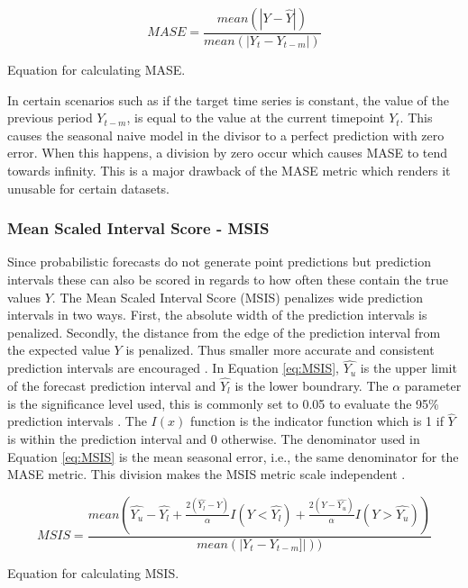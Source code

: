 \begin{eqfloat}
  \begin{equation}
    MASE = \frac{mean(|Y - \hat{Y}|)}{mean(|Y_t - Y_{t-m}|)}
    \label{eq:MASE}
  \end{equation}
  \caption{Equation for calculating MASE.}
\end{eqfloat}

In certain scenarios such as if the target time series is constant, the value of the previous period \(Y_{t-m}\), is equal to the value at the current timepoint \(Y_t\). This causes the seasonal naive model in the divisor to a perfect prediction with zero error. When this happens, a division by zero occur which causes MASE to tend towards infinity. This is a major drawback of the MASE metric which renders it unusable for certain datasets.

\subsubsection{Mean Scaled Interval Score - MSIS}
\label{sec:msis}
Since probabilistic forecasts do not generate point predictions but prediction intervals these can also be scored in regards to how often these contain the true values \(Y\). The Mean Scaled Interval Score (MSIS) penalizes wide prediction intervals in two ways. First, the absolute width of the prediction intervals is penalized. Secondly, the distance from the edge of the prediction interval from the expected value \(Y\) is penalized. Thus smaller more accurate and consistent prediction intervals are encouraged \cite{makridakis_m4_2020}. In Equation \ref{eq:MSIS}, \(\hat{Y_u}\) is the upper limit of the forecast prediction interval and \(\hat{Y_l}\) is the lower boundrary. The \(\alpha\) parameter is the significance level used, this is commonly set to 0.05 to evaluate the 95\% prediction intervals \cite{makridakis_m4_2020,gluonts-github}. The \(I(x)\) function is the indicator function which is 1 if \(\hat{Y}\) is within the prediction interval and 0 otherwise. The denominator used in Equation \ref{eq:MSIS} is the mean seasonal error, i.e., the same denominator for the MASE metric. This division makes the MSIS metric scale independent \cite{gluonts-github,makridakis_m4_2020}.

\begin{eqfloat}
  \begin{equation}
    MSIS = \frac{mean(\hat{Y_u} - \hat{Y_l} + \frac{2(\hat{Y_l}-Y)}{\alpha}I(Y<\hat{Y_l}) + \frac{2(Y-\hat{Y_u})}{\alpha}I(Y>\hat{Y_u}))}{mean(|Y_t - Y_{t-m}]|))}
    \label{eq:MSIS}
  \end{equation}
  \caption{Equation for calculating MSIS.}
\end{eqfloat}

